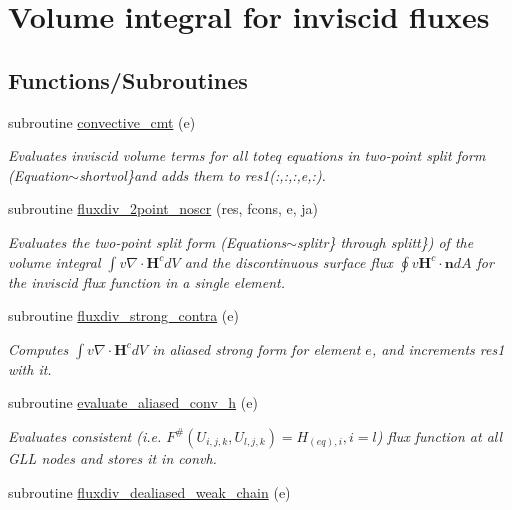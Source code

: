 \hypertarget{group__convhvol}{\section{Volume integral for inviscid fluxes}
\label{group__convhvol}
}
\subsection*{Functions/\-Subroutines}
\begin{DoxyCompactItemize}
\item 
subroutine \hyperlink{group__convhvol_ga77e7d7a46950fcbbf072e8e900cee272}{convective\-\_\-cmt} (e)
\begin{DoxyCompactList}\small\item\em Evaluates inviscid volume terms for all toteq equations in two-\/point split form (Equation$\sim$shortvol\}and adds them to res1(\-:,\-:,\-:,e,\-:). \end{DoxyCompactList}\item 
subroutine \hyperlink{group__convhvol_ga72c1cbe51bc537e14ec8927e62f0e3f3}{fluxdiv\-\_\-2point\-\_\-noscr} (res, fcons, e, ja)
\begin{DoxyCompactList}\small\item\em Evaluates the two-\/point split form (Equations$\sim$splitr\} through splitt\}) of the volume integral $\int v \nabla\cdot\mathbf{H}^c dV$ and the discontinuous surface flux $\oint v \mathbf{H}^c\cdot\mathbf{n} dA$ for the inviscid flux function in a single element. \end{DoxyCompactList}\item 
subroutine \hyperlink{group__convhvol_gab4831bb28a78e1c8fd3ec09854bd15ad}{fluxdiv\-\_\-strong\-\_\-contra} (e)
\begin{DoxyCompactList}\small\item\em Computes $\int v \nabla\cdot\mathbf{H}^c dV$ in aliased strong form for element $e$, and increments res1 with it. \end{DoxyCompactList}\item 
subroutine \hyperlink{group__convhvol_gad9d70d83f1184d25495812d637698102}{evaluate\-\_\-aliased\-\_\-conv\-\_\-h} (e)
\begin{DoxyCompactList}\small\item\em Evaluates consistent (i.\-e. $F^{\#}(U_{i,j,k},U_{l,j,k})=H_{(eq),i},i=l$) flux function at all G\-L\-L nodes and stores it in convh. \end{DoxyCompactList}\item 
\hypertarget{group__convhvol_ga89ba8fe53f8afc523597773aca62a270}{subroutine \hyperlink{group__convhvol_ga89ba8fe53f8afc523597773aca62a270}{fluxdiv\-\_\-dealiased\-\_\-weak\-\_\-chain} (e)}\label{group__convhvol_ga89ba8fe53f8afc523597773aca62a270}


\end{DoxyCompactItemize}
